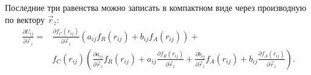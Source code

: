 Последние три равенства можно записать в компактном виде через производную по вектору $\vec{r}_z$:
\begin{align*}
 \frac{\partial U_{ij}}{\partial \vec{r}_z} = & \frac{\partial f_C(r_{ij})}{\partial \vec{r}_z}\left( a_{ij}f_R(r_{ij}) + b_{ij}f_A(r_{ij})\right) + \\
                                                                          & f_C(r_{ij}) \left( \frac{\partial a_{ij}}{\partial \vec{r}_z}f_R(r_{ij}) + 
                                                                          a_{ij} \frac{\partial f_R(r_{ij})}{\partial \vec{r}_z} + 
                                                                         \frac{\partial b_{ij}}{\partial \vec{r}_z}f_A(r_{ij}) + 
                                                                         b_{ij} \frac{\partial f_A(r_{ij})}{\partial \vec{r}_z} \right).
\end{align*}

